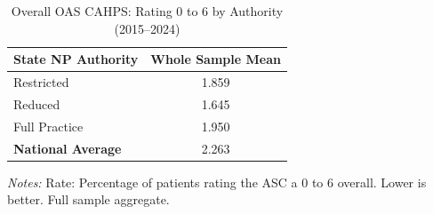 \begin{table}[htbp]
    \centering
    \caption{Overall OAS CAHPS: Rating 0 to 6 by Authority (2015--2024)}
    \label{tab:oas_rating_0_6_full}
    \vspace{0.2cm}
    \begin{tabular}{lc}
        \toprule
        \textbf{State NP Authority} & \textbf{Whole Sample Mean} \\
        \midrule
        Restricted & 1.859 \\
        Reduced & 1.645 \\
        Full Practice & 1.950 \\
        \midrule
        \textbf{National Average} & 2.263 \\
        \bottomrule
    \end{tabular}
    \vspace{0.1cm}
    \begin{minipage}{0.6\textwidth}
        \footnotesize \textit{Notes:} Rate: Percentage of patients rating the ASC a 0 to 6 overall. Lower is better. Full sample aggregate.
    \end{minipage}
\end{table}